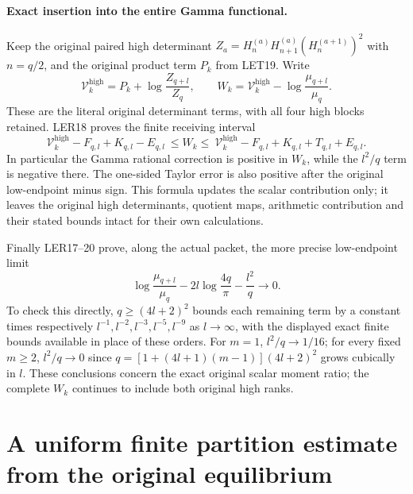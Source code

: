\documentclass[11pt,a4paper]{article}
\begin{document}
\paragraph{Exact insertion into the entire Gamma functional.}
Keep the original paired high determinant
$Z_a=H_n^{(a)}H_{n+1}^{(a)}(H_n^{(a+1)})^2$ with $n=q/2$, and
the original product term $P_k$ from LET19. Write
\[
 \mathcal V_k^{\mathrm{high}}=P_k+\log\frac{Z_{q+l}}{Z_q},\qquad
 W_k=\mathcal V_k^{\mathrm{high}}-\log\frac{\mu_{q+l}}{\mu_q}.
 \tag{LER21}
\]
These are the literal original determinant terms, with all four
high blocks retained. LER18 proves the finite receiving interval
\[
 \boxed{\displaystyle
 \mathcal V_k^{\mathrm{high}}-F_{q,l}+K_{q,l}-E_{q,l}
 \ \le W_k\le\
 \mathcal V_k^{\mathrm{high}}-F_{q,l}+K_{q,l}+T_{q,l}+E_{q,l}.}
 \tag{LER22}
\]
In particular the Gamma rational correction is positive in $W_k$,
while the $l^2/q$ term is negative there. The one-sided Taylor error
is also positive after the original low-endpoint minus sign.
This formula updates the scalar contribution only; it leaves the
original high determinants, quotient maps, arithmetic contribution
and their stated bounds intact for their own calculations.

Finally LER17--20 prove, along the actual packet, the more precise
low-endpoint limit
\[
 \log\frac{\mu_{q+l}}{\mu_q}-2l\log\frac{4q}{\pi}
 -\frac{l^2}{q}\longrightarrow0.
 \tag{LER23}
\]
To check this directly, $q\ge(4l+2)^2$ bounds each remaining term by
a constant times respectively $l^{-1},l^{-2},l^{-3},l^{-5},l^{-9}$
as $l\to\infty$, with the displayed exact finite bounds available
in place of these orders. For $m=1$, $l^2/q\to1/16$; for every
fixed $m\ge2$, $l^2/q\to0$ since
$q=[1+(4l+1)(m-1)](4l+2)^2$ grows cubically in $l$.
These conclusions concern the exact original scalar moment ratio;
the complete $W_k$ continues to include both original high ranks.



\section{A uniform finite partition estimate from the original equilibrium}
\label{sec:QLG}
\end{document}
